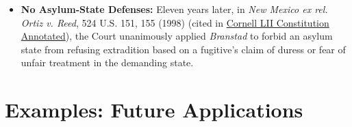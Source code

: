 \documentclass[12pt]{article}
\begin{document}
\begin{itemize}

\item \textbf{No Asylum-State Defenses:} Eleven years later, in \emph{New Mexico ex rel. Ortiz v. Reed}, 524 U.S. 151, 155 (1998) (cited in \href{https://www.law.cornell.edu/constitution-conan/article-4/section-2/clause-2/overview-of-extradition-interstate-rendition-clause}{Cornell LII Constitution Annotated}), the Court unanimously applied \emph{Branstad} to forbid an asylum state from refusing extradition based on a fugitive's claim of duress or fear of unfair treatment in the demanding state.

\end{itemize}

\section{Examples: Future Applications}
\end{document}
